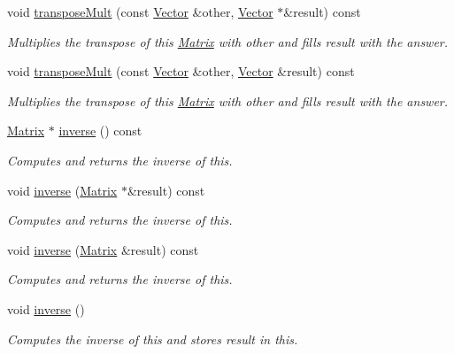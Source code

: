 \begin{DoxyCompactItemize}
void \hyperlink{class_c_a_r_o_m_1_1_matrix_ae4a76de340d58b627214871b17d0d32c}{transpose\-Mult} (const \hyperlink{class_c_a_r_o_m_1_1_vector}{Vector} \&other, \hyperlink{class_c_a_r_o_m_1_1_vector}{Vector} $\ast$\&result) const 
\begin{DoxyCompactList}\small\item\em Multiplies the transpose of this \hyperlink{class_c_a_r_o_m_1_1_matrix}{Matrix} with other and fills result with the answer. \end{DoxyCompactList}\item 
void \hyperlink{class_c_a_r_o_m_1_1_matrix_a515573e3b012530e6815aea821caf326}{transpose\-Mult} (const \hyperlink{class_c_a_r_o_m_1_1_vector}{Vector} \&other, \hyperlink{class_c_a_r_o_m_1_1_vector}{Vector} \&result) const 
\begin{DoxyCompactList}\small\item\em Multiplies the transpose of this \hyperlink{class_c_a_r_o_m_1_1_matrix}{Matrix} with other and fills result with the answer. \end{DoxyCompactList}\item 
\hyperlink{class_c_a_r_o_m_1_1_matrix}{Matrix} $\ast$ \hyperlink{class_c_a_r_o_m_1_1_matrix_a2a78bfc980b999b4d52e1e6eb599f0de}{inverse} () const 
\begin{DoxyCompactList}\small\item\em Computes and returns the inverse of this. \end{DoxyCompactList}\item 
void \hyperlink{class_c_a_r_o_m_1_1_matrix_a7a84bff8fd51c252a9f544be8d51aca7}{inverse} (\hyperlink{class_c_a_r_o_m_1_1_matrix}{Matrix} $\ast$\&result) const 
\begin{DoxyCompactList}\small\item\em Computes and returns the inverse of this. \end{DoxyCompactList}\item 
void \hyperlink{class_c_a_r_o_m_1_1_matrix_a87881d43ef01d485cb68ecffd3caa4c6}{inverse} (\hyperlink{class_c_a_r_o_m_1_1_matrix}{Matrix} \&result) const 
\begin{DoxyCompactList}\small\item\em Computes and returns the inverse of this. \end{DoxyCompactList}\item 
void \hyperlink{class_c_a_r_o_m_1_1_matrix_ad61ec4327aa2216d06ebcbab31fd0acc}{inverse} ()
\begin{DoxyCompactList}\small\item\em Computes the inverse of this and stores result in this. \end{DoxyCompactList}\item 

\end{DoxyCompactItemize}

